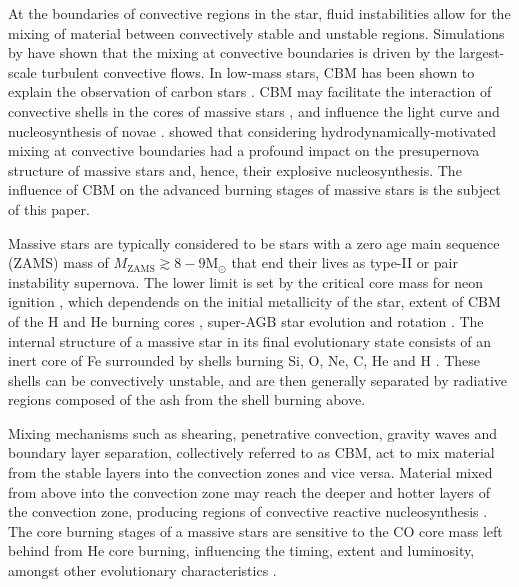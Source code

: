 \documentclass[useAMS,usenatbib]{mn2e}
\newcommand{\Msun}{\ensuremath{\mathrm{M}_\odot}}
\begin{document}
At the boundaries of convective regions in the star, fluid instabilities allow for the mixing of material between convectively stable and unstable regions. Simulations by 
\citet{Freytag1996,Meakin2007,Woodward:2013uf,Viallet2015,Jones2016} have shown that the mixing at convective boundaries is driven by the largest-scale turbulent convective flows. In low-mass stars, CBM has been shown to explain the observation of carbon
stars \citep{Herwig2000,Bertolli2013}. CBM may facilitate the interaction of convective shells in the
cores of massive stars \citep{Meakin2006,Jones2016}, and influence the light
curve and nucleosynthesis of novae \citep{Denissenkov2012}. \citet{Young2005}
showed that considering hydrodynamically-motivated mixing at convective
boundaries had a profound impact on the presupernova structure of massive
stars and, hence, their explosive nucleosynthesis. The influence of CBM on the
advanced burning stages of massive stars is the subject of this paper.

Massive stars are typically considered to be stars with a zero age main sequence
(ZAMS) mass of $M_\mathrm{ZAMS}\gtrsim8-9\Msun$ that end their lives as type-II or pair instability supernova. The lower limit is set by the
critical core mass for neon ignition
\citep{Nomoto1984,Jones2013,Jones2014,Doherty2015,Woosley2015}, which dependends on the initial metallicity of the star, extent of CBM of
the H and He burning cores \citep{Eldridge2004}, super-AGB star evolution \citep{Poelarends:2008fy} and rotation \citep{Farmer2015}. The internal structure of a massive star in its final evolutionary state consists of an inert core of Fe surrounded by shells burning Si, O, Ne, C, He and H 
\citep{Woosley2002}. These shells can be convectively unstable, and are then generally
separated by radiative regions composed of the ash from the shell
burning above.

Mixing mechanisms such as shearing, penetrative convection, gravity waves and
boundary layer separation, collectively referred to as CBM, act to mix material
from the stable layers into the convection zones and vice versa. Material mixed
from above into the convection zone may reach the deeper and hotter layers of the convection zone, producing regions of convective reactive nucleosynthesis \cite[e.g.][]{Herwig:2011dj,Ritter:2017vf}.
The core burning stages of a massive stars are sensitive to the CO core mass
left behind from He core burning, influencing the timing, extent
and luminosity, amongst other evolutionary characteristics 
\citep[e.g.][]{Sukhbold2014}. 
\end{document}
